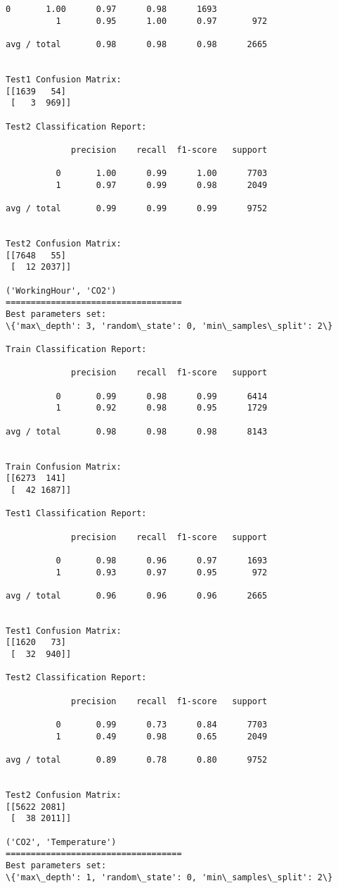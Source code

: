 \documentclass[11pt]{article}
\begin{document}
\begin{Verbatim}[commandchars=\\\{\}]
          0       1.00      0.97      0.98      1693
          1       0.95      1.00      0.97       972

avg / total       0.98      0.98      0.98      2665


Test1 Confusion Matrix:
[[1639   54]
 [   3  969]]

Test2 Classification Report:

             precision    recall  f1-score   support

          0       1.00      0.99      1.00      7703
          1       0.97      0.99      0.98      2049

avg / total       0.99      0.99      0.99      9752


Test2 Confusion Matrix:
[[7648   55]
 [  12 2037]]

('WorkingHour', 'CO2')
===================================
Best parameters set:
\{'max\_depth': 3, 'random\_state': 0, 'min\_samples\_split': 2\}

Train Classification Report:

             precision    recall  f1-score   support

          0       0.99      0.98      0.99      6414
          1       0.92      0.98      0.95      1729

avg / total       0.98      0.98      0.98      8143


Train Confusion Matrix:
[[6273  141]
 [  42 1687]]

Test1 Classification Report:

             precision    recall  f1-score   support

          0       0.98      0.96      0.97      1693
          1       0.93      0.97      0.95       972

avg / total       0.96      0.96      0.96      2665


Test1 Confusion Matrix:
[[1620   73]
 [  32  940]]

Test2 Classification Report:

             precision    recall  f1-score   support

          0       0.99      0.73      0.84      7703
          1       0.49      0.98      0.65      2049

avg / total       0.89      0.78      0.80      9752


Test2 Confusion Matrix:
[[5622 2081]
 [  38 2011]]

('CO2', 'Temperature')
===================================
Best parameters set:
\{'max\_depth': 1, 'random\_state': 0, 'min\_samples\_split': 2\}


\end{Verbatim}
\end{document}
